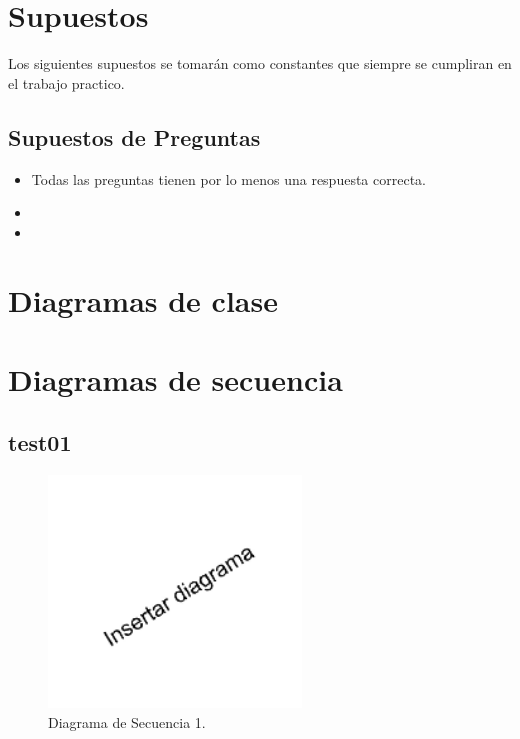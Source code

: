 \documentclass[titlepage,a4paper]{article}
\begin{document}
\section{Supuestos}\label{sec:supuestos}

Los siguientes supuestos se tomarán como constantes que siempre se cumpliran en el trabajo practico.
	
	\subsection{Supuestos de Preguntas}
    \begin{itemize}
      \item Todas las preguntas tienen por lo menos una respuesta correcta.
      \item 
      \item 
    \end{itemize}
  


\newpage
\section{Diagramas de clase}\label{sec:diagramasdeclase} 



\section{Diagramas de secuencia}\label{sec:diagramasdesecuencia}

\subsection{test01}

\begin{figure}[H]
\centering
\includegraphics[width= 0.6\textwidth]{diagrama_secuencia01.png} 
\caption{\label{fig:seq01} Diagrama de Secuencia 1.}
\end{figure}
\end{document}
